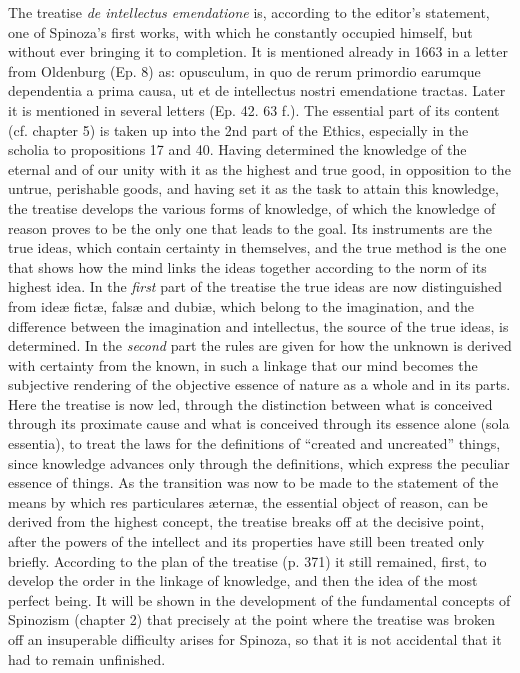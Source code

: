 \documentclass[12pt,a4paper,openany]{book}
\newcommand{\opage}[1]{\marginnote{\footnotesize\textit{[#1]}}}
\begin{document}
\opage{38}The treatise \emph{de intellectus emendatione} is, according to the
editor's statement, one of Spinoza's first works, with which he
constantly occupied himself, but without ever bringing it to completion.
It is mentioned already in 1663 in a letter from Oldenburg (Ep. 8) as:
opusculum, in quo de rerum primordio earumque dependentia a prima causa,
ut et de intellectus nostri emendatione tractas. Later it is mentioned in
several letters (Ep. 42. 63 f.). The essential part of its content (cf.
chapter 5) is taken up into the 2nd part of the Ethics, especially in the
scholia to propositions 17 and 40. Having determined the knowledge of the
eternal and of our unity with it as the highest and true good, in
opposition to the untrue, perishable goods, and having set it as the
task to attain this knowledge, the treatise develops the various forms
of knowledge, of which the knowledge of reason proves to be the only one
that leads to the goal. Its instruments are the true ideas, which
contain certainty in themselves, and the true method is the one that
shows how the mind links the ideas together according to the norm of
its highest idea. In the \emph{first} part of the treatise the true ideas
are now distinguished from ideæ fictæ, falsæ and dubiæ, which belong to
the imagination, and the difference between the imagination and
intellectus, the source of the true ideas, is determined. In the
\emph{second} part the rules are given for how the unknown is derived
with certainty from the known, in such a linkage that our mind becomes
the subjective rendering of the objective essence of nature as a whole
and in its parts. Here the treatise is now led, through the distinction
between what is conceived through its proximate cause and what is
conceived through its essence alone (sola essentia), to treat the laws
for the definitions of ``created and uncreated'' things, since knowledge
advances only through the definitions, which express the peculiar
essence of things. As the transition was now to be made to the statement
of the means by which res particulares æternæ, the essential object of
reason, can be derived from the highest concept, the treatise breaks off
at the decisive point, after the powers of the intellect and its
properties have still been treated only briefly.
\opage{39}According to the plan of the treatise (p. 371) it still remained,
first, to develop the order in the linkage of knowledge, and then the
idea of the most perfect being. It will be shown in the development of
the fundamental concepts of Spinozism (chapter 2) that precisely at the
point where the treatise was broken off an insuperable difficulty arises
for Spinoza, so that it is not accidental that it had to remain
unfinished.
\end{document}
